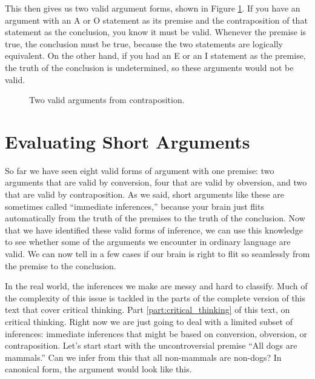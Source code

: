 This then gives us two valid argument forms, shown in Figure \ref{fig:contraposition_arguments}. If you have an argument with an A or O statement as its premise and the contraposition of that statement as the conclusion, you know it must be valid. Whenever the premise is true, the conclusion must be true, because the two statements are logically equivalent. On the other hand, if you had an E or an I statement as the premise, the truth of the conclusion is undetermined, so these arguments would not be valid.

\begin{figure}
\begin{minipage}[t]{0.4\textwidth}
\begin{kormanize}
\end{kormanize}
\end{minipage}\hspace{1cm}
\begin{minipage}[t]{0.4\textwidth}
\begin{kormanize}
\end{kormanize}
\end{minipage}
\caption{Two valid arguments from contraposition.}
\label{fig:contraposition_arguments}
\end{figure}

\section{Evaluating Short Arguments}\label{sec:ESA}

So far we have seen eight valid forms of argument with one premise: two arguments that are valid by conversion, four that are valid by obversion, and two that are valid by contraposition. As we said, short arguments like these are sometimes called ``immediate inferences,'' because your brain just flits automatically from the truth of the premises to the truth of the conclusion. Now that we have identified these valid forms of inference, we can use this knowledge to see whether some of the arguments we encounter in ordinary language are valid. We can now tell in a few cases if our brain is right to flit so seamlessly from the premise to the conclusion.

In the real world, the inferences we make are messy and hard to classify. Much of the complexity of this issue is tackled in the parts of the complete version of this text that cover critical thinking. Part \ref{part:critical_thinking} of this text, on critical thinking. Right now we are just going to deal with a limited subset of inferences: immediate inferences that might be based on conversion, obversion, or contraposition. Let's start start with the uncontroversial premise ``All dogs are mammals.'' Can we infer from this that all non-mammals are non-dogs? In canonical form, the argument would look like this.

